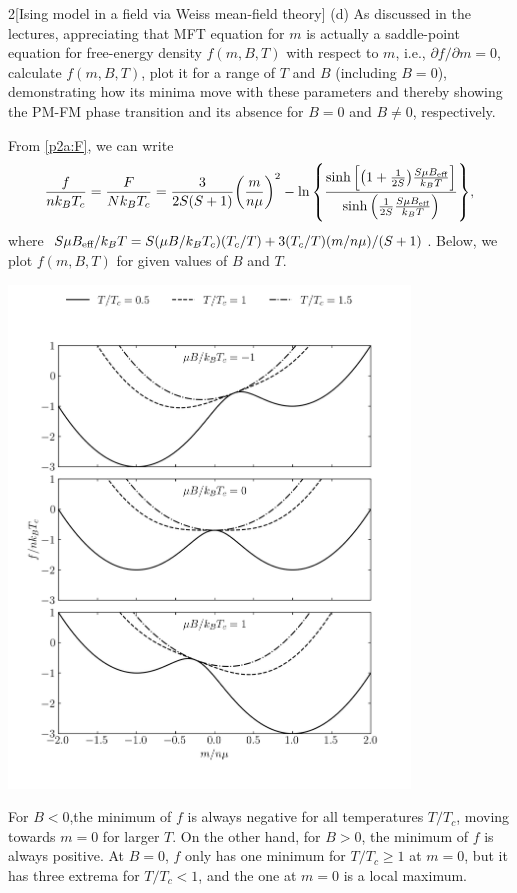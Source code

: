 \documentclass[12pt]{article}
\begin{document}
\begin{problem}{2}[Ising model in a field via Weiss mean-field theory]
(d) As discussed in the lectures, appreciating that MFT equation for $m$ is
actually a saddle-point equation for free-energy density $f(m,B,T)$ with respect
to $m$, i.e., $\partial f/\partial m=0$, calculate $f(m,B,T)$, plot it for a
range of $T$ and $B$ (including $B=0$), demonstrating how its minima move with
these parameters and thereby showing the PM-FM phase transition and its absence
for $B=0$ and $B\neq 0$, respectively.
\begin{solution}
From \eqref{p2a:F}, we can write
\begin{equation}
    \frac{f}{nk_BT_c}=\frac{F}{Nk_BT_c}
    =\frac{3}{2S(S+1)}\qty(\frac{m}{n\mu})^2-\ln\qty{\frac{\sinh\qty[\qty(1+\frac1{2S})\frac{S\mu
    B_{\text{eff}}}{k_BT}]}{\sinh\qty(\frac1{2S}\frac{S\mu B_{\text{eff}}}{k_BT})}},
\end{equation}
where $S\mu B_{\text{eff}}/k_BT=S(\mu B/k_BT_c)(T_c/T)+3(T_c/T)(m/n\mu)/(S+1)$.
Below, we plot $f(m,B,T)$ for given values of $B$ and $T$.
\begin{center}
    \includegraphics[width=0.8\textwidth]{p2d.png} 
\end{center}
For $B<0$,the minimum of $f$ is always negative for all temperatures $T/T_c$,
moving towards $m=0$ for larger $T$. On the other hand, for $B>0$, the minimum 
of $f$ is always positive. At $B=0$, $f$ only has one minimum for
$T/T_c\geq 1$ at $m=0$, but it has three extrema for $T/T_c<1$, and the one at
$m=0$ is a local maximum.
\end{solution}


\end{problem}
\end{document}
